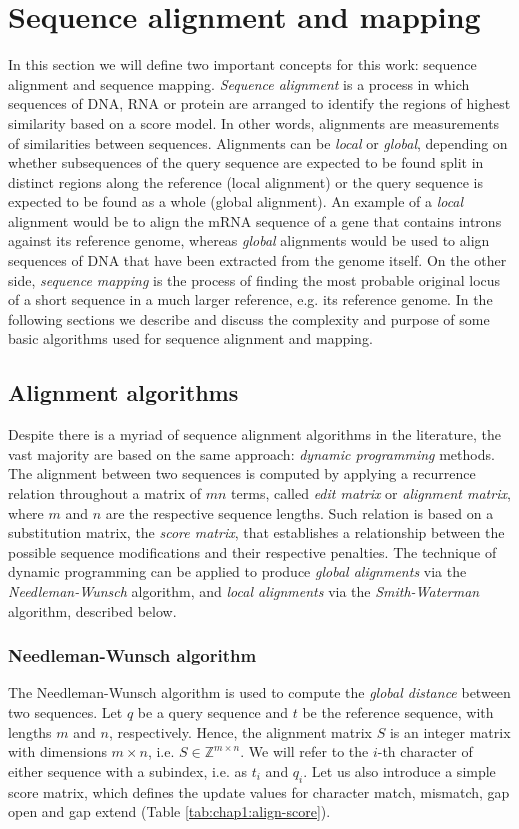\section{Sequence alignment and mapping}
\label{sec:chap1:mapping}
In this section we will define two important concepts for this work:
sequence alignment and sequence mapping. {\em Sequence alignment} is a
process in which sequences of DNA, RNA or protein are arranged to
identify the regions of highest similarity based on a score model. In
other words, alignments are measurements of similarities between
sequences. Alignments can be {\em local} or {\em global}, depending on
whether subsequences of the query sequence are expected to be found
split in distinct regions along the reference (local alignment) or the query sequence is
expected to be found as a whole (global alignment). An example of a {\em
  local} alignment would be to align the mRNA sequence of a gene that
contains introns against its reference genome, whereas {\em global}
alignments would be used to align sequences of DNA that have been
extracted from the genome itself. On the other side, {\em sequence
  mapping} is the process of finding the most probable original locus
of a short sequence in a much larger reference, e.g. its reference
genome. In the following sections we describe and discuss the
complexity and purpose of some basic algorithms used for sequence
alignment and mapping.  

\subsection{Alignment algorithms}
\label{sec:chap1:align}
Despite there is a myriad of sequence alignment algorithms in the
literature, the vast majority are based on the same approach: {\em
  dynamic programming} methods. The alignment between two sequences is
computed by applying a recurrence 
relation throughout a matrix of $mn$ terms, called {\em edit matrix}
or {\em alignment matrix},
where $m$ and $n$ are the respective sequence lengths. Such relation
is based on a substitution matrix, the {\em score matrix}, that
establishes a relationship between the possible sequence modifications
and their respective penalties. The technique of dynamic programming
can be applied to produce {\em global alignments} via the {\em
Needleman-Wunsch} algorithm, and {\em local alignments} via the
{\em Smith-Waterman} algorithm, described below.
\subsubsection{Needleman-Wunsch algorithm}
\label{sec:chap1:align-nw}
The Needleman-Wunsch algorithm is used to compute the {\em global distance}
between two sequences. Let $q$ be a query sequence and
$t$ be the reference sequence, with lengths $m$ and $n$,
respectively. Hence, the alignment matrix
$S$ is an integer matrix with dimensions $m \times n$, i.e. $S \in
\mathbb{Z}^{m \times n}$. We will refer to the $i$-th character of
either sequence with a subindex, i.e. as $t_i$ and $q_i$. Let us also
introduce a simple score matrix, which defines the update values for
character match, mismatch, gap open and gap extend (Table
\ref{tab:chap1:align-score}).

